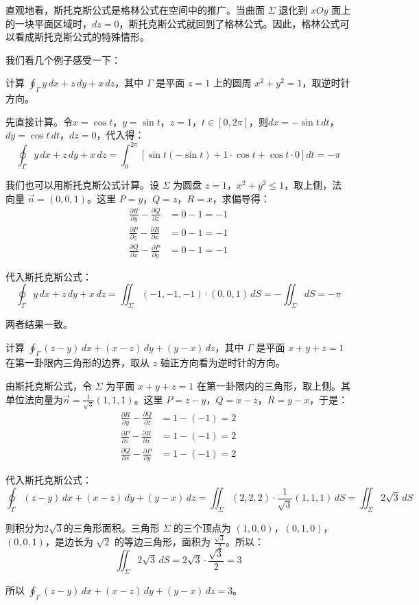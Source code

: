 直观地看，斯托克斯公式是格林公式在空间中的推广。当曲面 $\Sigma$ 退化到 $xOy$ 面上的一块平面区域时，$dz=0$，斯托克斯公式就回到了格林公式。因此，格林公式可以看成斯托克斯公式的特殊情形。

我们看几个例子感受一下：

\begin{myexample}
计算 $\oint_{\Gamma} y\,dx + z\,dy + x\,dz$，其中 $\Gamma$ 是平面 $z=1$ 上的圆周 $x^2+y^2=1$，取逆时针方向。

先直接计算。令$x=\cos t$，$y=\sin t$，$z=1$，$t\in[0,2\pi]$，则\(dx=-\sin t\,dt\)，\(dy=\cos t\,dt\)，\(dz=0\)，代入得：
\[
\oint_{\Gamma} y\,dx+z\,dy+x\,dz
=
\int_0^{2\pi}\left[\sin t(-\sin t)+1\cdot\cos t+\cos t\cdot 0\right]dt
= -\pi
\]

我们也可以用斯托克斯公式计算。设 $\Sigma$ 为圆盘 $z=1$，$x^2+y^2\le 1$，取上侧，法向量 $\vec{n}=(0,0,1)$。这里 $P=y$，$Q=z$，$R=x$，求偏导得：
\[
\begin{aligned}
\frac{\partial R}{\partial y}-\frac{\partial Q}{\partial z}&=0-1=-1\\
\frac{\partial P}{\partial z}-\frac{\partial R}{\partial x}&=0-1=-1\\
\frac{\partial Q}{\partial x}-\frac{\partial P}{\partial y}&=0-1=-1
\end{aligned}
\]

代入斯托克斯公式：
\[
\oint_{\Gamma} y\,dx+z\,dy+x\,dz
=
\iint_{\Sigma}(-1,-1,-1)\cdot(0,0,1)\,dS
=
-\iint_{\Sigma}dS
= -\pi
\]

两者结果一致。
\end{myexample}

\begin{myexample}
计算 $\oint_{\Gamma}(z-y)\,dx+(x-z)\,dy+(y-x)\,dz$，其中 $\Gamma$ 是平面 $x+y+z=1$ 在第一卦限内三角形的边界，取从 $z$ 轴正方向看为逆时针的方向。

由斯托克斯公式，令 $\Sigma$ 为平面 $x+y+z=1$ 在第一卦限内的三角形，取上侧。其单位法向量为\(\vec{n}=\frac{1}{\sqrt{3}}(1,1,1)\)。这里 $P=z-y$，$Q=x-z$，$R=y-x$，于是：
\[
\begin{aligned}
\frac{\partial R}{\partial y}-\frac{\partial Q}{\partial z}&=1-(-1)=2\\
\frac{\partial P}{\partial z}-\frac{\partial R}{\partial x}&=1-(-1)=2\\
\frac{\partial Q}{\partial x}-\frac{\partial P}{\partial y}&=1-(-1)=2
\end{aligned}
\]

代入斯托克斯公式：
\[
\oint_{\Gamma}(z-y)\,dx+(x-z)\,dy+(y-x)\,dz
=
\iint_{\Sigma}(2,2,2)\cdot\frac{1}{\sqrt{3}}(1,1,1)\,dS
=
\iint_{\Sigma}2\sqrt{3}\,dS
\]

则积分为\(2\sqrt{3}\)的三角形面积。三角形 $\Sigma$ 的三个顶点为 $(1,0,0)$，$(0,1,0)$，$(0,0,1)$，是边长为 $\sqrt{2}$ 的等边三角形，面积为 $\frac{\sqrt{3}}{2}$。所以：
\[
\iint_{\Sigma}2\sqrt{3}\,dS
=
2\sqrt{3}\cdot\frac{\sqrt{3}}{2}
=
3
\]

所以 $\oint_{\Gamma}(z-y)\,dx+(x-z)\,dy+(y-x)\,dz=3$。
\end{myexample}

